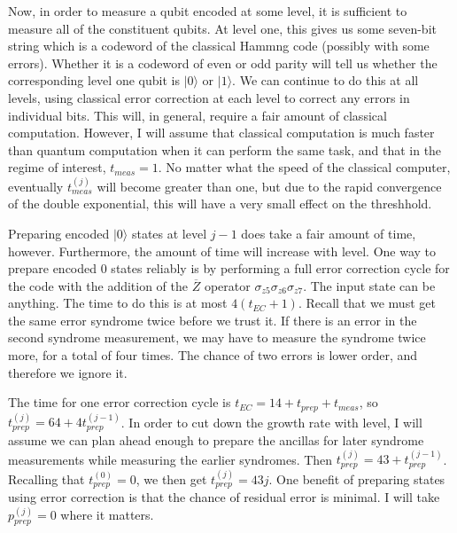 \documentclass{report}
\newcommand{\ket}[1]{|{#1}\rangle}
\newcommand{\Zs}[1]{\sigma_{z{#1}}}
\newcommand{\Zbar}{\overline{Z}}
\newcommand{\ppj}[1]{p_{prep}^{({#1})}}
\newcommand{\tpj}[1]{t_{prep}^{({#1})}}
\newcommand{\tmj}[1]{t_{meas}^{({#1})}}
\begin{document}
Now, in order to measure a qubit encoded at some level, it is sufficient to 
measure all of the constituent qubits.  At level one, this gives us some 
seven-bit string which is a codeword of the classical Hammng code (possibly 
with some errors).  Whether it is a codeword of even or odd parity will tell us 
whether the corresponding level one qubit is $\ket{0}$ or $\ket{1}$.  We can 
continue to do this at all levels, using classical error correction at each 
level to correct any errors in individual bits.  This will, in general, require 
a fair amount of classical computation.  However, I will assume that classical 
computation is much faster than quantum computation when it can 
perform the same task, and that in the regime of interest, $t_{meas} = 1$.  
No matter what the speed of the classical computer, eventually $\tmj{j}$ 
will become greater than one, but due to the rapid convergence of the double 
exponential, this will have a very small effect on the threshhold.

Preparing encoded $\ket{0}$ states at level $j-1$ does take a fair amount 
of time, however.  Furthermore, the amount of time will increase with 
level.  One way to prepare encoded $0$ states reliably is by performing a 
full error correction cycle for the code with the addition of the $\Zbar$ 
operator $\Zs{5} \Zs{6} \Zs{7}$.  The input state can be anything.  The time to 
do this is at most $4(t_{EC} + 1)$.  Recall that we must get the same error 
syndrome twice before we trust it.  If there is an error in the second 
syndrome measurement, we may have to measure the syndrome twice 
more, for a total of four times.  The chance of two errors is lower order, 
and therefore we ignore it.

The time for one error correction cycle is $t_{EC} = 14 + t_{prep} + 
t_{meas}$, so $\tpj{j} = 64 + 4 \tpj{j-1}$.  In order to cut down the growth 
rate with level, I will assume we can plan ahead enough to prepare the 
ancillas for later syndrome measurements while measuring the earlier 
syndromes.  Then $\tpj{j} = 43 + \tpj{j-1}$.  Recalling that $\tpj{0} = 0$, we 
then get $\tpj{j} = 43 j$.  One benefit of preparing states using error 
correction is that the chance of residual error is minimal.  I will take 
$\ppj{j} = 0$ where it matters.
\end{document}
